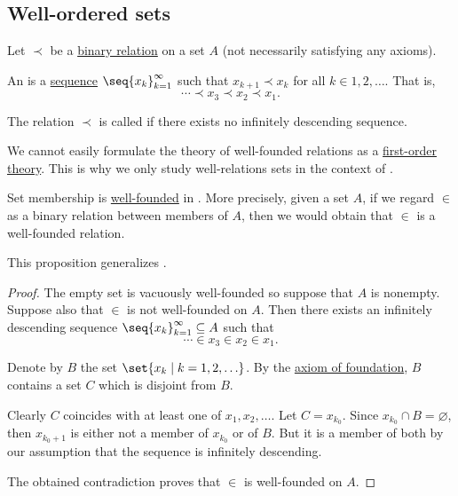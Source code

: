 \subsection{Well-ordered sets}\label{subsec:well_ordered_sets}

\begin{definition}\label{def:well_founded_relation}
  Let \( \prec \) be a \hyperref[def:binary_relation]{binary relation} on a set \( A \) (not necessarily satisfying any axioms).

  An  is a \hyperref[def:sequence]{sequence} \( \seq{ x_k }_{k=1}^\infty \) such that \( x_{k+1} \prec x_k \) for all \( k \in 1, 2, \ldots \). That is,
  \begin{equation*}
    \cdots \prec x_3 \prec x_2 \prec x_1.
  \end{equation*}

  The relation \( \prec \) is called  if there exists no infinitely descending sequence.

  We cannot easily formulate the theory of well-founded relations as a \hyperref[def:first_order_theory]{first-order theory}. This is why we only study well-relations sets in the context of .
\end{definition}

\begin{proposition}\label{thm:set_membership_is_well_founded}
  Set membership is \hyperref[def:well_founded_relation]{well-founded} in . More precisely, given a set \( A \), if we regard \( \in \) as a binary relation between members of \( A \), then we would obtain that \( \in \) is a well-founded relation.

  This proposition generalizes .
\end{proposition}
\begin{proof}
  The empty set is vacuously well-founded so suppose that \( A \) is nonempty. Suppose also that \( \in \) is not well-founded on \( A \). Then there exists an infinitely descending sequence \( \seq{ x_k }_{k=1}^\infty \subseteq A \) such that
  \begin{equation*}
    \cdots \in x_3 \in x_2 \in x_1.
  \end{equation*}

  Denote by \( B \) the set \( \set{ x_k \given k = 1, 2, \ldots } \). By the \hyperref[def:zfc/foundation]{axiom of foundation}, \( B \) contains a set \( C \) which is disjoint from \( B \).

  Clearly \( C \) coincides with at least one of \( x_1, x_2, \ldots \). Let \( C = x_{k_0} \). Since \( x_{k_0} \cap B = \varnothing \), then \( x_{k_0 + 1} \) is either not a member of \( x_{k_0} \) or of \( B \). But it is a member of both by our assumption that the sequence is infinitely descending.

  The obtained contradiction proves that \( \in \) is well-founded on \( A \).
\end{proof}

